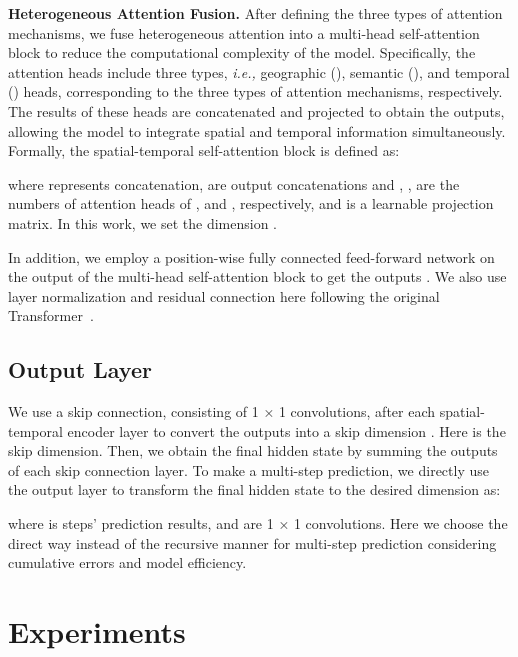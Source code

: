 \documentclass[letterpaper]{article} \usepackage{aaai23}  \usepackage{times}  \usepackage{helvet}  \usepackage{courier}  \usepackage[hyphens]{url}  \usepackage{graphicx} \urlstyle{rm} \def\UrlFont{\rm}  \usepackage{natbib}  \usepackage{caption} \frenchspacing  \setlength{\pdfpagewidth}{8.5in} \setlength{\pdfpageheight}{11in} \usepackage{algorithm}
\newcommand{\paratitle}[1]{\vspace{1.5ex}\noindent\textbf{#1}}
\newcommand{\ie}{\emph{i.e.,}\xspace}
\newcommand{\tah}{\xspace}
\newcommand{\tsa}{\xspace}
\newcommand{\gsah}{\xspace}
\newcommand{\ssah}{\xspace}
\newcommand{\gssa}{\xspace}
\newcommand{\sssa}{\xspace}
\begin{document}
\paratitle{Heterogeneous Attention Fusion.} After defining the three types of attention mechanisms, we fuse heterogeneous attention into a multi-head self-attention block to reduce the computational complexity of the model. Specifically, the attention heads include three types, \ie geographic (\gsah), semantic (\ssah), and temporal (\tah) heads, corresponding to the three types of attention mechanisms, respectively. The results of these heads are concatenated and projected to obtain the outputs, allowing the model to integrate spatial and temporal information simultaneously. Formally, the spatial-temporal self-attention block is defined as:

where  represents concatenation,  are output concatenations and , ,  are the numbers of attention heads of \gssa, \sssa and \tsa, respectively, and  is a learnable projection matrix. In this work, we set the dimension .




In addition, we employ a position-wise fully connected feed-forward network on the output of the multi-head self-attention block to get the outputs . We also use layer normalization and residual connection here following the original Transformer~\cite{transformer}. 



\subsection{Output Layer}



We use a skip connection, consisting of 1 × 1 convolutions, after each spatial-temporal encoder layer to convert the outputs  into a skip dimension . Here  is the skip dimension. Then, we obtain the final hidden state  by summing the outputs of each skip connection layer. To make a multi-step prediction, we directly use the output layer to transform the final hidden state  to the desired dimension as:

where  is  steps' prediction results,  and  are 1 × 1 convolutions. Here we choose the direct way instead of the recursive manner for multi-step prediction considering cumulative errors and model efficiency.










\section{Experiments}
\end{document}
